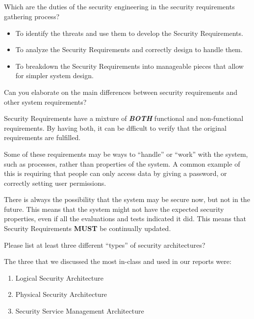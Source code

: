 \begin{questions}
\begin{parts}
  \part{} Which are the duties of the security engineering in the security requirements gathering process?
    \begin{solution}
      \begin{itemize}[noitemsep]
      \item To identify the threats and use them to develop the Security Requirements.
      \item To analyze the Security Requirements and correctly design to handle them.
      \item To breakdown the Security Requirements into manageable pieces that allow for simpler system design.
      \end{itemize}
    \end{solution}
  \end{parts}

\question{} Can you elaborate on the main differences between security requirements and other system requirements?
  \begin{solution}
    Security Requirements have a mixture of \emph{\textbf{BOTH}} functional and non-functional requirements.
    By having both, it can be dfficult to verify that the original requirements are fulfilled.

    Some of these requirements may be ways to ``handle'' or ``work'' with the system, such as processes, rather than properties of the system.
    A common example of this is requiring that people can only access data by giving a password, or correctly setting user permissions.

    There is always the possibility that the system may be secure now, but not in the future.
    This means that the system might not have the expected security properties, even if all the evaluations and tests indicated it did.
    This means that Security Requirements \textbf{MUST} be continually updated.
  \end{solution}

\question{} Please list at least three different “types” of security architectures?
  \begin{solution}
    The three that we discussed the most in-class and used in our reports were:
    \begin{enumerate}[noitemsep]
    \item Logical Security Architecture
    \item Physical Security Architecture
    \item Security Service Management Architecture
    \end{enumerate}
  \end{solution}


\end{questions}
